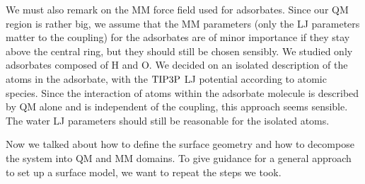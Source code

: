 We must also remark on the MM force field used for adsorbates. Since our QM
region is rather big, we assume that the MM parameters (only the LJ parameters
matter to the coupling) for the adsorbates are of minor importance if they stay
above the central ring, but they should still be chosen sensibly. We studied
only adsorbates composed of H and O. We decided on an isolated description of
the atoms in the adsorbate, with the $\text{TIP3P}$ LJ potential according to atomic
species. Since the interaction of atoms within the adsorbate molecule is
described by QM alone and is independent of the coupling, this approach seems
sensible. The water LJ parameters should still be reasonable for the isolated
atoms.


Now we talked about how to define the surface geometry and how to decompose
the system into QM and MM domains. To give guidance for a general approach to
set up a surface model, we want to repeat the steps we took.

